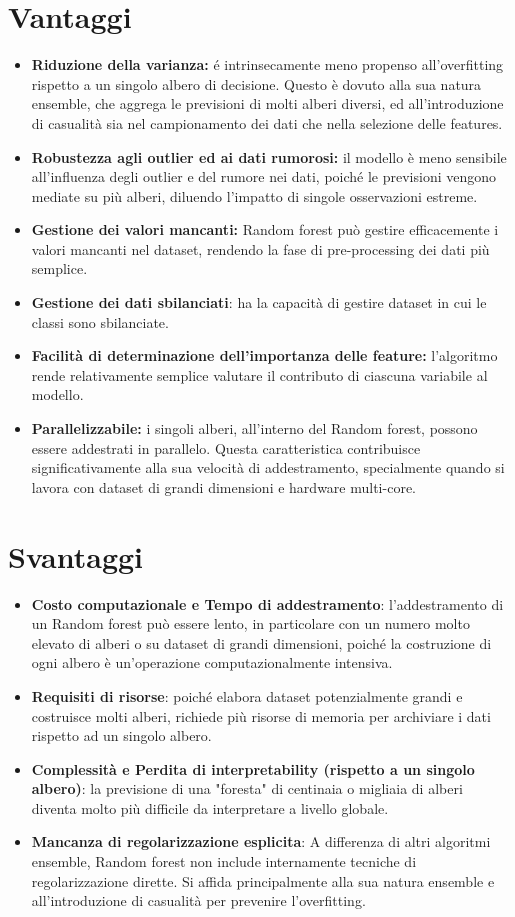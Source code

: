 \documentclass[a4paper,12pt]{report}
\begin{document}
	\section{Vantaggi}
	\begin{itemize}
		\item \textbf{Riduzione della varianza:} é intrinsecamente meno propenso all'overfitting rispetto a un singolo albero di decisione. Questo è dovuto alla sua natura ensemble, che aggrega le previsioni di molti alberi diversi, ed all'introduzione di casualità sia nel campionamento dei dati che nella selezione delle features.
		\item \textbf{Robustezza agli outlier ed ai dati rumorosi:} il modello è meno sensibile all'influenza degli outlier e del rumore nei dati, poiché le previsioni vengono mediate su più alberi, diluendo l'impatto di singole osservazioni estreme.
		\item \textbf{Gestione dei valori mancanti:} Random forest può gestire efficacemente i valori mancanti nel dataset, rendendo la fase di pre-processing dei dati più semplice.
		\item \textbf{Gestione dei dati sbilanciati}: ha la capacità di gestire dataset in cui le classi sono sbilanciate.
		\item \textbf{Facilità di determinazione dell'importanza delle feature:} l'algoritmo rende relativamente semplice valutare il contributo di ciascuna variabile al modello.
		\item \textbf{Parallelizzabile:} i singoli alberi, all'interno del Random forest, possono essere addestrati in parallelo. Questa caratteristica contribuisce significativamente alla sua velocità di addestramento, specialmente quando si lavora con dataset di grandi dimensioni e hardware multi-core.
	\end{itemize}
	
	\section{Svantaggi}
	\begin{itemize}
		\item \textbf{Costo computazionale e Tempo di addestramento}: l'addestramento di un Random forest può essere lento, in particolare con un numero molto elevato di alberi o su dataset di grandi dimensioni, poiché la costruzione di ogni albero è un'operazione computazionalmente intensiva.
		\item \textbf{Requisiti di risorse}: poiché elabora dataset potenzialmente grandi e costruisce molti alberi, richiede più risorse di memoria per archiviare i dati rispetto ad un singolo albero.
		\item \textbf{Complessità e Perdita di interpretability (rispetto a un singolo albero)}: la previsione di una "foresta" di centinaia o migliaia di alberi diventa molto più difficile da interpretare a livello globale.
		\item \textbf{Mancanza di regolarizzazione esplicita}: A differenza di altri algoritmi ensemble, Random forest non include internamente tecniche di regolarizzazione dirette. Si affida principalmente alla sua natura ensemble e all'introduzione di casualità per prevenire l'overfitting.
	\end{itemize}
	
\end{document}
